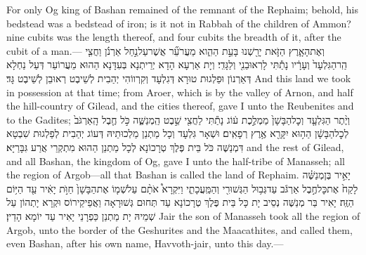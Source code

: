 {For only Og king of Bashan remained of the remnant of the Rephaim; behold, his bedstead was a bedstead of iron; is it not in Rabbah of the children of Ammon? nine cubits was the length thereof, and four cubits the breadth of it, after the cubit of a man.—}{}
{וְאֶת\maqqaf הָאָ֧רֶץ הַזֹּ֛את יָרַ֖שְׁנוּ בָּעֵ֣ת הַהִ֑וא מֵעֲרֹעֵ֞ר אֲשֶׁר\maqqaf עַל\maqqaf נַ֣חַל אַרְנֹ֗ן וַחֲצִ֤י הַֽר\maqqaf הַגִּלְעָד֙ וְעָרָ֔יו נָתַ֕תִּי לָרֽאוּבֵנִ֖י וְלַגָּדִֽי׃}
{וְיָת אַרְעָא הָדָא יְרֵיתְנָא בְּעִדָּנָא הַהוּא מֵעֲרוֹעֵר דְּעַל נַחְלָא דְּאַרְנוֹן וּפַלְגוּת טוּרָא דְּגִלְעָד וְקִרְווֹהִי יְהַבִית לְשֵׁיבֶט רְאוּבֵן לְשֵׁיבֶט גָּד׃}
{And this land we took in possession at that time; from Aroer, which is by the valley of Arnon, and half the hill-country of Gilead, and the cities thereof, gave I unto the Reubenites and to the Gadites;}{}
{וְיֶ֨תֶר הַגִּלְעָ֤ד וְכׇל\maqqaf הַבָּשָׁן֙ מַמְלֶ֣כֶת ע֔וֹג נָתַ֕תִּי לַחֲצִ֖י שֵׁ֣בֶט הַֽמְנַשֶּׁ֑ה כֹּ֣ל חֶ֤בֶל הָֽאַרְגֹּב֙ לְכׇל\maqqaf הַבָּשָׁ֔ן הַה֥וּא יִקָּרֵ֖א אֶ֥רֶץ רְפָאִֽים׃}
{וּשְׁאָר גִּלְעָד וְכָל מַתְנַן מַלְכוּתֵיהּ דְּעוֹג יְהַבִית לְפַלְגוּת שִׁבְטָא דִּמְנַשֶּׁה כֹּל בֵּית פֶּלֶךְ טְרָכוֹנָא לְכָל מַתְנַן הַהוּא מִתְקְרֵי אֲרַע גִּבָּרַיָּא׃}
{and the rest of Gilead, and all Bashan, the kingdom of Og, gave I unto the half-tribe of Manasseh; all the region of Argob—all that Bashan is called the land of Rephaim.}{}
{יָאִ֣יר בֶּן\maqqaf מְנַשֶּׁ֗ה לָקַח֙ אֶת\maqqaf כׇּל\maqqaf חֶ֣בֶל אַרְגֹּ֔ב עַד\maqqaf גְּב֥וּל הַגְּשׁוּרִ֖י וְהַמַּֽעֲכָתִ֑י וַיִּקְרָא֩ אֹתָ֨ם עַל\maqqaf שְׁמ֤וֹ אֶת\maqqaf הַבָּשָׁן֙ חַוֺּ֣ת יָאִ֔יר עַ֖ד הַיּ֥וֹם הַזֶּֽה׃}
{יָאִיר בַּר מְנַשֶּׁה נְסֵיב יָת כָּל בֵּית פֶּלֶךְ טְרָכוֹנָא עַד תְּחוּם גְּשׁוּרָאָה וַאֲפֵיקֵירוֹס וּקְרָא יָתְהוֹן עַל שְׁמֵיהּ יָת מַתְנַן כַּפְרָנֵי יָאִיר עַד יוֹמָא הָדֵין׃}
{Jair the son of Manasseh took all the region of Argob, unto the border of the Geshurites and the Maacathites, and called them, even Bashan, after his own name, Havvoth-jair, unto this day.—}{}
